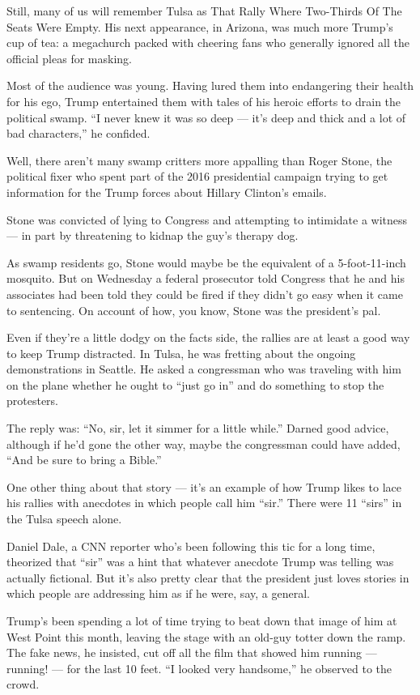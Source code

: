 Still, many of us will remember Tulsa as That Rally Where Two-Thirds Of
The Seats Were Empty. His next appearance, in Arizona, was much more
Trump's cup of tea: a megachurch packed with cheering fans who generally
ignored all the official pleas for masking.

Most of the audience was young. Having lured them into endangering their
health for his ego, Trump entertained them with tales of his heroic
efforts to drain the political swamp. ``I never knew it was so deep ---
it's deep and thick and a lot of bad characters,'' he confided.

Well, there aren't many swamp critters more appalling than Roger Stone,
the political fixer who spent part of the 2016 presidential campaign
trying to get information for the Trump forces about Hillary Clinton's
emails.

Stone was convicted of lying to Congress and attempting to intimidate a
witness --- in part by threatening to kidnap the guy's therapy dog.

As swamp residents go, Stone would maybe be the equivalent of a
5-foot-11-inch mosquito. But on Wednesday a federal prosecutor told
Congress that he and his associates had been told they could be fired if
they didn't go easy when it came to sentencing. On account of how, you
know, Stone was the president's pal.

Even if they're a little dodgy on the facts side, the rallies are at
least a good way to keep Trump distracted. In Tulsa, he was fretting
about the ongoing demonstrations in Seattle. He asked a congressman who
was traveling with him on the plane whether he ought to ``just go in''
and do something to stop the protesters.

The reply was: ``No, sir, let it simmer for a little while.'' Darned
good advice, although if he'd gone the other way, maybe the congressman
could have added, ``And be sure to bring a Bible.''

One other thing about that story --- it's an example of how Trump likes
to lace his rallies with anecdotes in which people call him ``sir.''
There were 11 ``sirs'' in the Tulsa speech alone.

Daniel Dale, a CNN reporter who's been following this tic for a long
time, theorized that ``sir'' was a hint that whatever anecdote Trump was
telling was actually fictional. But it's also pretty clear that the
president just loves stories in which people are addressing him as if he
were, say, a general.

Trump's been spending a lot of time trying to beat down that image of
him at West Point this month, leaving the stage with an old-guy totter
down the ramp. The fake news, he insisted, cut off all the film that
showed him running --- running! --- for the last 10 feet. ``I looked
very handsome,'' he observed to the crowd.

